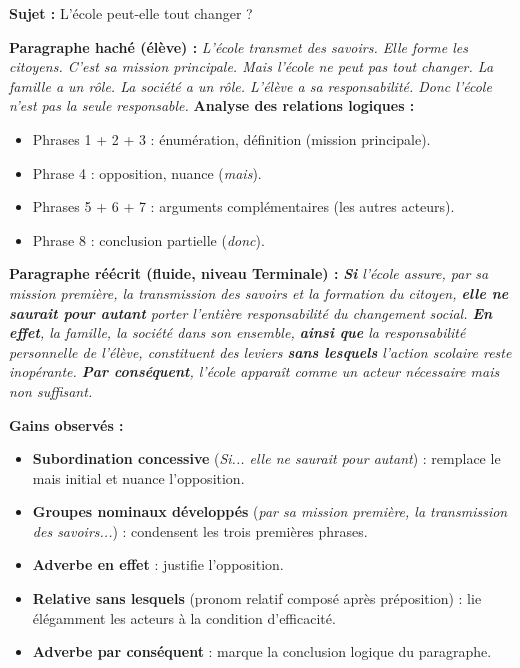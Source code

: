 \documentclass[11pt]{article}
\begin{document}
\begin{exoresolu}
\textbf{Sujet :} \og L'école peut-elle tout changer ?\fg

\textbf{Paragraphe haché (élève) :}
\emph{L'école transmet des savoirs. Elle forme les citoyens. C'est sa mission principale. Mais l'école ne peut pas tout changer. La famille a un rôle. La société a un rôle. L'élève a sa responsabilité. Donc l'école n'est pas la seule responsable.}
\tcblower
\textbf{Analyse des relations logiques :}
\begin{itemize}
    \item Phrases 1 + 2 + 3 : énumération, définition (mission principale).
    \item Phrase 4 : opposition, nuance (\emph{mais}).
    \item Phrases 5 + 6 + 7 : arguments complémentaires (les autres acteurs).
    \item Phrase 8 : conclusion partielle (\emph{donc}).
\end{itemize}

\textbf{Paragraphe réécrit (fluide, niveau Terminale) :}
\emph{\textbf{Si} l'école assure, par sa mission première, la transmission des savoirs et la formation du citoyen, \textbf{elle ne saurait pour autant} porter l'entière responsabilité du changement social. \textbf{En effet}, la famille, la société dans son ensemble, \textbf{ainsi que} la responsabilité personnelle de l'élève, constituent des leviers \textbf{sans lesquels} l'action scolaire reste inopérante. \textbf{Par conséquent}, l'école apparaît comme un acteur nécessaire mais non suffisant.}

\textbf{Gains observés :}
\begin{itemize}
    \item \textbf{Subordination concessive} (\emph{Si... elle ne saurait pour autant}) : remplace le \og mais\fg{} initial et nuance l'opposition.
    \item \textbf{Groupes nominaux développés} (\emph{par sa mission première, la transmission des savoirs...}) : condensent les trois premières phrases.
    \item \textbf{Adverbe \og en effet\fg} : justifie l'opposition.
    \item \textbf{Relative \og sans lesquels\fg} (pronom relatif composé après préposition) : lie élégamment les acteurs à la condition d'efficacité.
    \item \textbf{Adverbe \og par conséquent\fg} : marque la conclusion logique du paragraphe.
\end{itemize}
\end{exoresolu}
\end{document}
